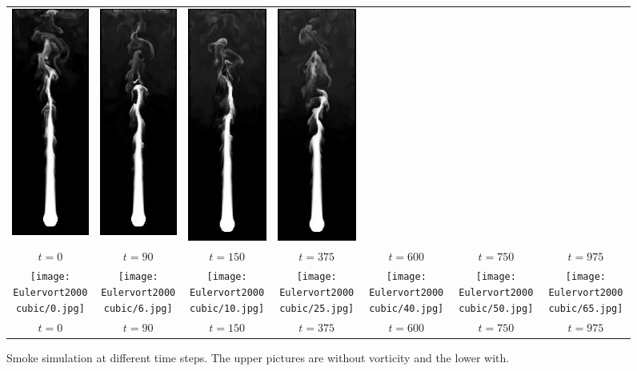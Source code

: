 \documentclass[accepted,single]{gipaper}
\begin{document}
\begin{figure}
\begin{center}
\begin{tabular}{ccccccc}
      \includegraphics[width=0.12\linewidth]{Eulernovort1000cubic/25.jpg} & \includegraphics[width=0.12\linewidth]{Eulernovort1000cubic/40.jpg} & \includegraphics[width=0.12\linewidth]{Eulernovort1000cubic/50.jpg} & 
      \includegraphics[width=0.12\linewidth]{Eulernovort1000cubic/65.jpg} \\

      $t = 0$ & $t = 90$ & $t = 150$ & $t = 375$ & $t = 600$  & $t = 750$ & $t = 975$ \\[0.5cm]
      \texttt{[image: Eulervort2000cubic/0.jpg]} &  \texttt{[image: Eulervort2000cubic/6.jpg]}&  \texttt{[image: Eulervort2000cubic/10.jpg]}
      &  \texttt{[image: Eulervort2000cubic/25.jpg]} &  \texttt{[image: Eulervort2000cubic/40.jpg]} &  \texttt{[image: Eulervort2000cubic/50.jpg]}
      &  \texttt{[image: Eulervort2000cubic/65.jpg]} \\
      $t = 0$ & $t = 90$ & $t = 150$ & $t = 375$ & $t = 600$  & $t = 750$ & $t = 975$ \\ 
    \end{tabular}
    \caption{Smoke simulation at different time steps. The upper pictures are without vorticity and the lower with.}
    \label{vorttest}
  \end{center}
\end{figure}
\end{document}
